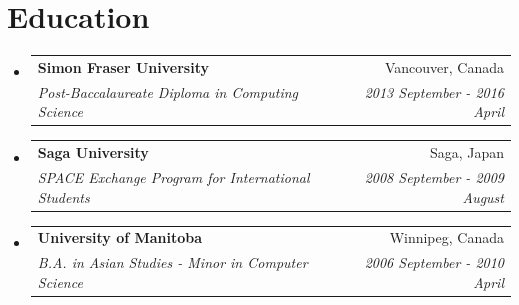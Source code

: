 \documentclass[letterpaper,11pt]{article}
\makeatletter
\newcommand{\resumeSubheading}[4]{
  \vspace{-1pt}\item
    \begin{tabular*}{0.97\textwidth}[t]{l@{\extracolsep{\fill}}r}
      \textbf{#1} & #2 \\
      \textit{\small#3} & \textit{\small #4} \\
    \end{tabular*}\vspace{-5pt}
}
\newcommand{\resumeSubHeadingListStart}{\begin{itemize}[leftmargin=*]}
\newcommand{\resumeSubHeadingListEnd}{\end{itemize}}
\makeatother
\begin{document}
  \section{Education}
  \resumeSubHeadingListStart
  \resumeSubheading
      {Simon Fraser University}{Vancouver, Canada}
      {Post-Baccalaureate Diploma in Computing Science}{2013 September - 2016 April}
      \resumeSubheading
          {Saga University}{Saga, Japan}
          {SPACE Exchange Program for International Students}{2008 September - 2009 August}
          \resumeSubheading
              {University of Manitoba}{Winnipeg, Canada}
              {B.A. in Asian Studies - Minor in Computer Science}{2006 September - 2010 April}
              \resumeSubHeadingListEnd


%
\end{document}
